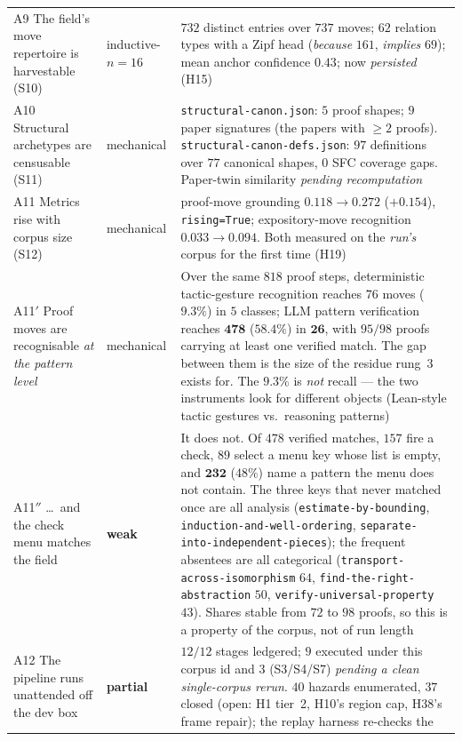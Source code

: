 \documentclass[11pt]{article}
\newcommand{\hz}[1]{\textsf{#1}}
\begin{document}
{\begin{longtable}{p{} p{} p{}}
A9 The field's move repertoire is harvestable (S10) & inductive-$n{=}16$ &
$732$ distinct entries over $737$ moves; $62$ relation types with a Zipf
head (\emph{because} $161$, \emph{implies} $69$); mean anchor confidence
$0.43$; now \emph{persisted} (\hz{H15})\\[3pt]
A10 Structural archetypes are censusable (S11) & mechanical &
\texttt{structural-canon.json}: $5$ proof shapes; $9$ paper signatures (the
papers with $\ge 2$ proofs). \texttt{structural-canon-defs.json}: $97$
definitions over $77$ canonical shapes, $0$ SFC coverage gaps. Paper-twin
similarity \emph{pending recomputation}\\[3pt]
A11 Metrics rise with corpus size (S12) & mechanical &
proof-move grounding $0.118 \to 0.272$ ($+0.154$), \texttt{rising=True};
expository-move recognition $0.033 \to 0.094$. Both measured on the
\emph{run's} corpus for the first time (\hz{H19})\\[3pt]
A11$'$ Proof moves are recognisable \emph{at the pattern level} & mechanical &
Over the same $818$ proof steps, deterministic tactic-gesture recognition reaches
$76$ moves ($9.3\%$) in $5$ classes; LLM pattern verification reaches
$\mathbf{478}$ ($\mathbf{58.4\%}$) in $\mathbf{26}$, with $95/98$ proofs carrying
at least one verified match. The gap between them is the size of the residue
rung~3 exists for. The $9.3\%$ is \emph{not} recall --- the two instruments look
for different objects (Lean-style tactic gestures vs.\ reasoning patterns)\\[3pt]
A11$''$ \dots\ and the check menu matches the field & \textbf{weak} &
It does not. Of $478$ verified matches, $157$ fire a check, $89$ select a menu
key whose list is empty, and $\mathbf{232}$ ($48\%$) name a pattern the menu does
not contain. The three keys that never matched once are all analysis
(\texttt{estimate-by-bounding}, \texttt{induction-and-well-ordering},
\texttt{separate-into-independent-pieces}); the frequent absentees are all
categorical (\texttt{transport-across-isomorphism} $64$,
\texttt{find-the-right-abstraction} $50$, \texttt{verify-universal-property}
$43$). Shares stable from $72$ to $98$ proofs, so this is a property of the
corpus, not of run length\\[3pt]
A12 The pipeline runs unattended off the dev box & \textbf{partial} &
$12/12$ stages ledgered; $9$ executed under this corpus id and $3$
(S3/S4/S7) \emph{pending a clean single-corpus rerun}. $40$ hazards
enumerated, $37$ closed (open: \hz{H1} tier~2, \hz{H10}'s region cap,
\hz{H38}'s frame repair); the replay harness re-checks the

\end{longtable}}
\end{document}
